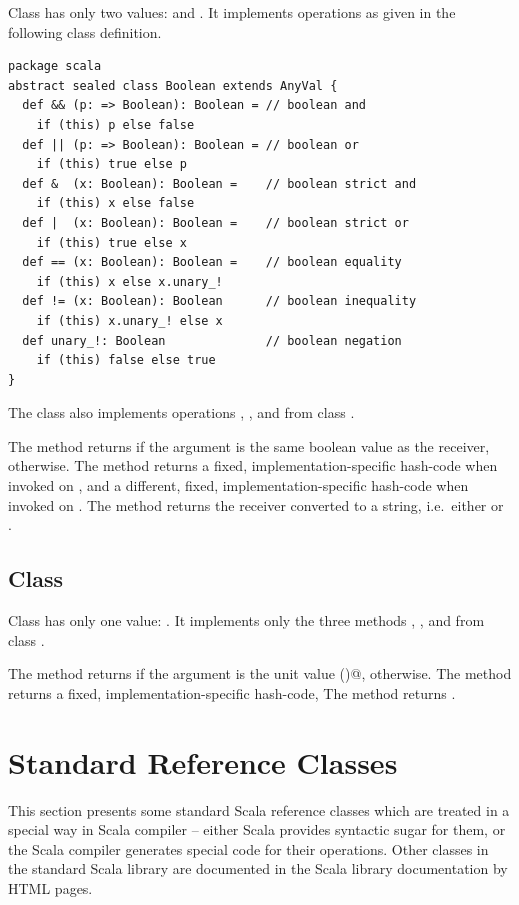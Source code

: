 Class  has only two values:  and
. It implements operations as given in the following
class definition.
\begin{lstlisting}
package scala 
abstract sealed class Boolean extends AnyVal {
  def && (p: => Boolean): Boolean = // boolean and
    if (this) p else false
  def || (p: => Boolean): Boolean = // boolean or
    if (this) true else p
  def &  (x: Boolean): Boolean =    // boolean strict and
    if (this) x else false
  def |  (x: Boolean): Boolean =    // boolean strict or
    if (this) true else x
  def == (x: Boolean): Boolean =    // boolean equality
    if (this) x else x.unary_!
  def != (x: Boolean): Boolean      // boolean inequality
    if (this) x.unary_! else x
  def unary_!: Boolean              // boolean negation
    if (this) false else true
}
\end{lstlisting}
The class also implements operations , ,
and  from class .

The  method returns  if the argument is the
same boolean value as the receiver,  otherwise.  The
 method returns a fixed, implementation-specific hash-code when invoked on , 
and a different, fixed, implementation-specific hash-code when invoked on . The  method
returns the receiver converted to a string, i.e.\ either 
or .

\subsection{Class \large{}}

Class  has only one value: \code{()}. It implements only
the three methods , , and 
from class .

The  method returns  if the argument is the
unit value \lstinline@()@,  otherwise.  The
 method returns a fixed, implementation-specific hash-code, 
The  method returns .

\section{Standard Reference Classes}
\label{cls:reference}

This section presents some standard Scala reference classes which are
treated in a special way in Scala compiler -- either Scala provides
syntactic sugar for them, or the Scala compiler generates special code
for their operations. Other classes in the standard Scala library are
documented in the Scala library documentation by HTML pages.

